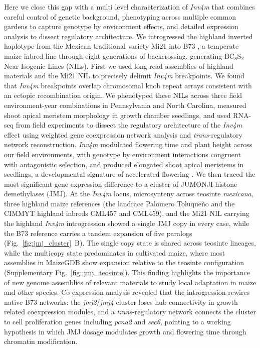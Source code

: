 \documentclass[9pt,twocolumn,twoside]{rilabRxiv}
\newcommand{\invfour}{\textit{Inv4m}\xspace}
\newcommand{\jmjii}{\textit{jmj2}\xspace}
\newcommand{\jmjiv}{\textit{jmj4}\xspace}
\begin{document}
Here we close this gap with a multi level characterization of \invfour that combines careful control of genetic background, phenotyping across multiple common gardens to capture genotype by environment effects, and detailed expression analysis to dissect regulatory architecture.
We introgressed the highland inverted haplotype from the Mexican traditional variety Mi21 \citep{Hayano-Kanashiro2009-ao} into B73 \citep{Schnable2009-jq}, a temperate maize inbred line through eight generations of backcrossing, generating BC$_8$S$_2$ Near Isogenic Lines (NILs).
First we used long read assemblies of highland materials and the Mi21 NIL to precisely delimit \invfour breakpoints.
We found that \invfour breakpoints overlap chromosomal knob repeat arrays consistent with an ectopic recombination origin.
We phenotyped these NILs across three field environment-year combinations in Pennsylvania and North Carolina, measured shoot apical meristem morphology in growth chamber seedlings, and used RNA-seq from field experiments to dissect the regulatory architecture of the \invfour effect using weighted gene coexpression network analysis and \textit{trans}-regulatory network reconstruction.
\invfour modulated flowering time and plant height across our field environments, with genotype by environment interactions congruent with antagonistic selection, and produced elongated shoot apical meristems in seedlings, a developmental signature of accelerated flowering \citep{danilevskaya2008, wu2008, leiboff2015, thompson2015}.
We then traced the most significant gene expression difference to a cluster of JUMONJI histone demethylases (JMJ).
At the \invfour locus, microsynteny across teosinte \textit{mexicana}, three highland maize references (the landrace Palomero Toluqueño and the CIMMYT highland inbreds CML457 and CML459), and the Mi21 NIL carrying the highland \invfour introgression showed a single JMJ copy in every case, while the B73 reference carries a tandem expansion of five paralogs (Fig.~\ref{fig:jmj_cluster}~B).
The single copy state is shared across teosinte lineages, while the multicopy state predominates in cultivated maize, where most assemblies in MaizeGDB show expansion relative to the teosinte configuration (Supplementary Fig.~\ref{fig::jmj_teosinte}).
This finding highlights the importance of new genome assemblies of relevant materials to study local adaptation in maize and other species.
Co-expression analysis revealed that the introgression rewires native B73 networks: the \jmjii/\jmjiv cluster loses hub connectivity in growth related coexpression modules, and a \textit{trans}-regulatory network connects the cluster to cell proliferation genes including \textit{pcna2} and \textit{sec6}, pointing to a working hypothesis in which JMJ dosage modulates growth and flowering time through chromatin modification.
\end{document}
